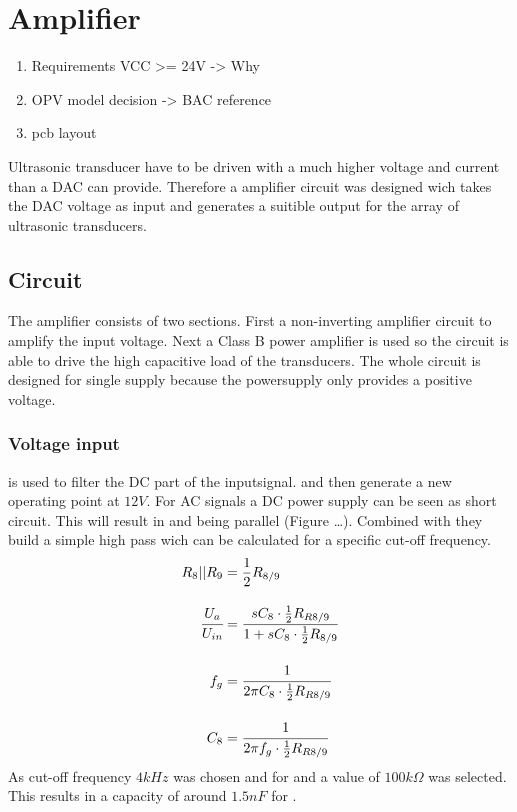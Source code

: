 \section{Amplifier}\label{sec:pcb:amp}

\begin{enumerate}
  \item Requirements
  \subitem VCC >= 24V -> Why
  \item OPV model decision -> BAC reference
  \item pcb layout
\end{enumerate}

Ultrasonic transducer have to be driven with a much higher voltage and current than a DAC can provide. Therefore a amplifier circuit was designed wich takes the DAC voltage as input and generates a suitible output for the array of ultrasonic transducers.

\subsection{Circuit}

The amplifier consists of two sections. First a non-inverting amplifier circuit to amplify the input voltage. Next a Class B power amplifier is used so the circuit is able to drive the high capacitive load of the transducers. The whole circuit is designed for single supply because the powersupply only provides a positive voltage.\p

\subsubsection*{Voltage input}
%
 is used to filter the DC part of the inputsignal.  and  then generate a new operating point at $12V$. For AC signals a DC power supply can be seen as short circuit. This will result in  and  being parallel (Figure \dots). Combined with  they build a simple high pass wich can be calculated for a specific cut-off frequency.
%
\begin{align}
  R_8 || R_9 &= \frac{1}{2} R_{8/9} \pmath
  \cfrac{U_a}{U_{in}} &= \cfrac{sC_8\cdot \frac{1}{2}R_{R8/9}}{1 + sC_8\cdot \frac{1}{2}R_{8/9}} \pmath
  f_g &= \cfrac{1}{2 \pi C_8 \cdot \frac{1}{2}R_{R8/9}} \pmath
  C_8 &= \cfrac{1}{2 \pi f_g \cdot \frac{1}{2}R_{R8/9}}
\end{align}
%
As cut-off frequency $4kHz$ was chosen and for  and  a value of $100k\Omega$ was selected. This results in a capacity of around $1.5nF$ for .\p

